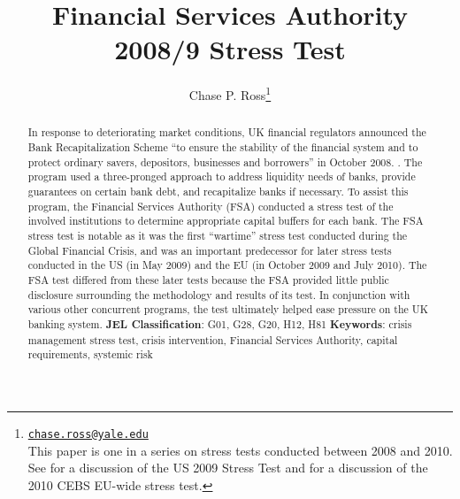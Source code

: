\documentclass[12pt]{article}
\begin{document}
\lhead{}
\rhead{}

\renewcommand{\headrulewidth}{0.0pt}
\renewcommand{\footrulewidth}{0.0pt}


\title{Financial Services Authority 2008/9 Stress Test}
\author{Chase P. Ross\thanks{\texttt{\href{mailto:chase.ross@yale.edu}{chase.ross@yale.edu}} \\ This paper is one in a series on stress tests conducted between 2008 and 2010. See \citet{Ross2016a} for a discussion of the US 2009 Stress Test and \citet{Ross2016b} for a discussion of the 2010 CEBS EU-wide stress test.}}



\maketitle

\begin{abstract}

In response to deteriorating market conditions, UK financial regulators announced the Bank Recapitalization Scheme ``to ensure the stability of the financial system and to protect ordinary savers, depositors, businesses and borrowers'' in October 2008. \citep{BRSAnnouncement}. The program used a three-pronged approach to address liquidity needs of banks, provide guarantees on certain bank debt, and recapitalize banks if necessary. To assist this program, the Financial Services Authority (FSA) conducted a stress test of the involved institutions to determine appropriate capital buffers for each bank. The FSA stress test is notable as it was the first ``wartime'' stress test conducted during the Global Financial Crisis, and was an important predecessor for later stress tests conducted in the US (in May 2009) and the EU (in October 2009 and July 2010). The FSA test differed from these later tests because the FSA provided little public disclosure surrounding the methodology and results of its test. In conjunction with various other concurrent programs, the test ultimately helped ease pressure on the UK banking system.
\newline
\newline
\textbf{JEL Classification}: G01, G28, G20, H12, H81
\newline
\newline
\textbf{Keywords}: crisis management stress test, crisis intervention, Financial Services Authority, capital requirements, systemic risk

\end{abstract}
\newpage
\tableofcontents
\newpage
\end{document}
